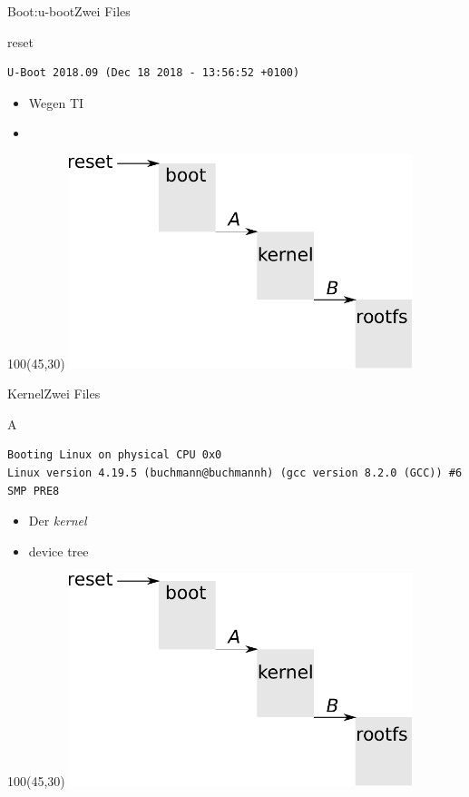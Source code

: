 \documentclass{beamer}
\begin{document}
\begin{frame}[fragile]{Boot:u-boot}{Zwei Files}
\begin{block}{reset}
{\tiny
\begin{verbatim}
U-Boot 2018.09 (Dec 18 2018 - 13:56:52 +0100)
\end{verbatim}
}
\end{block}
 \begin{itemize}
  \item {} Wegen TI
  \item {}
 \end{itemize}
\begin{textblock}{100}(45,30)
 \includegraphics[width=0.75\textwidth]{components.pdf}
\end{textblock} 
\end{frame}

\begin{frame}[fragile]{Kernel}{Zwei Files}
\begin{block}{A}
{
\tiny
\begin{verbatim}
Booting Linux on physical CPU 0x0					       
Linux version 4.19.5 (buchmann@buchmannh) (gcc version 8.2.0 (GCC)) #6 SMP PRE8
\end{verbatim}
}
\end{block}
\begin{itemize}
 \item {} Der {\em kernel}
 \item {} device tree
 \end{itemize}
\begin{textblock}{100}(45,30)
 \includegraphics[width=0.75\textwidth]{components.pdf}
\end{textblock} 
\end{frame}
\end{document}
